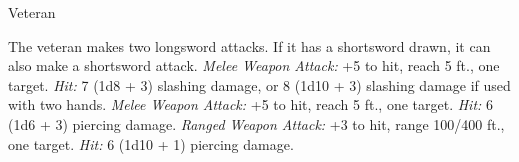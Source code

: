 \documentclass[10pt,a4paper,twoside,twocolumn,openany,bg=none,nodeprecatedcode]{dndbook}
\begin{document}
\begin{DndMonster}[float*=t]{Veteran}
\DndMonsterBasics[
armor-class = {17 (splint armor)},
hit-points = {\DndDice{9d8 + 18}},
speed = {30 ft.}
]
\DndMonsterAbilityScores[
 str = 16,
 dex = 13,
 con = 14,
 int = 10,
 wis = 11,
 cha = 10
]
\DndMonsterDetails[
skills = {Athletics +5, Perception +2},
languages = {any one language (usually Common)},
challenge = 3,
]
\par
{}
The veteran makes two longsword attacks. If it has a shortsword drawn, it can also make a shortsword attack.
\textsl{Melee Weapon Attack:} +5 to hit, reach 5 ft., one target. \textsl{Hit:} 7 (1d8 + 3) slashing damage, or 8 (1d10 + 3) slashing damage if used with two hands.
\textsl{Melee Weapon Attack:} +5 to hit, reach 5 ft., one target. \textsl{Hit:} 6 (1d6 + 3) piercing damage.
\textsl{Ranged Weapon Attack:} +3 to hit, range 100/400 ft., one target. \textsl{Hit:} 6 (1d10 + 1) piercing damage.
\end{DndMonster}


\end{document}
